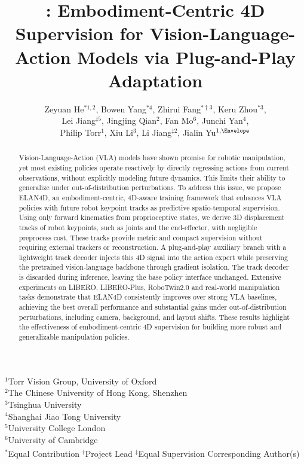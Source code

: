 \documentclass{article}
\title{\alias: Embodiment-Centric 4D Supervision for Vision-Language-Action Models via Plug-and-Play Adaptation}
\author{\mdseries
Zeyuan He$^{*1,2}$, Bowen Yang$^{*4}$, Zhirui Fang$^{*\dagger3}$, Keru Zhou$^{*3}$, \\
Lei Jiang$^{\ddagger5}$, Jingjing Qian$^{2}$, Fan Mo$^{6}$, Junchi Yan$^{4}$, \\
Philip Torr$^{1}$, Xiu Li$^{3}$, Li Jiang$^{\ddagger2}$, Jialin Yu$^{1,\text{\Envelope}}$
}
\newcommand{\alias}{ELAN4D\xspace}
\begin{document}
\maketitle
\vspace{-3em}
\begin{center}
$^1$Torr Vision Group, University of Oxford\\
$^2$The Chinese University of Hong Kong, Shenzhen\\
$^3$Tsinghua University\\
$^4$Shanghai Jiao Tong University\\
$^5$University College London\\
$^6$University of Cambridge\\
$^*$Equal Contribution \qquad
$^\dagger$Project Lead \qquad
$^\ddagger$Equal Supervision \qquad
\textsuperscript{\Envelope}Corresponding Author(s)
\end{center}
\vspace{1em}

\begin{abstract}
    Vision-Language-Action (VLA) models have shown promise for robotic manipulation, yet most existing policies operate reactively by directly regressing actions from current observations, without explicitly modeling future dynamics. This limits their ability to generalize under out-of-distribution perturbations. To address this issue, we propose \alias, an embodiment-centric, 4D-aware training framework that enhances VLA policies with future robot keypoint tracks as predictive spatio-temporal supervision. Using only forward kinematics from proprioceptive states, we derive 3D displacement tracks of robot keypoints, such as joints and the end-effector, with negligible preprocess cost. These tracks provide metric and compact supervision without requiring external trackers or reconstruction. A plug-and-play auxiliary branch with a lightweight track decoder injects this 4D signal into the action expert while preserving the pretrained vision-language backbone through gradient isolation. The track decoder is discarded during inference, leaving the base policy interface unchanged. Extensive experiments on LIBERO, LIBERO-Plus, RoboTwin2.0 and real-world manipulation tasks demonstrate that \alias consistently improves over strong VLA baselines, achieving the best overall performance and substantial gains under out-of-distribution perturbations, including camera, background, and layout shifts. These results highlight the effectiveness of embodiment-centric 4D supervision for building more robust and generalizable manipulation policies.
\end{abstract}
\end{document}
